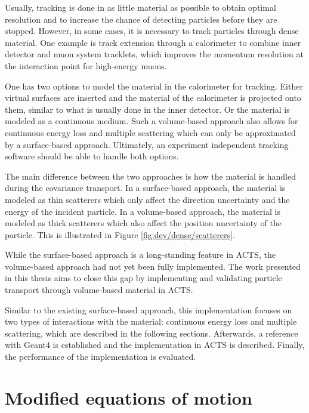 Usually, tracking is done in as little material as possible to obtain optimal resolution and to increase the chance of detecting particles before they are stopped. However, in some cases, it is necessary to track particles through dense material. One example is track extension through a calorimeter to combine inner detector and muon system tracklets, which improves the momentum resolution at the interaction point for high-energy muons.

One has two options to model the material in the calorimeter for tracking. Either virtual surfaces are inserted and the material of the calorimeter is projected onto them, similar to what is usually done in the inner detector. Or the material is modeled as a continuous medium. Such a volume-based approach also allows for continuous energy loss and multiple scattering which can only be approximated by a surface-based approach. Ultimately, an experiment independent tracking software should be able to handle both options.

The main difference between the two approaches is how the material is handled during the covariance transport. In a surface-based approach, the material is modeled as thin scatterers which only affect the direction uncertainty and the energy of the incident particle. In a volume-based approach, the material is modeled as thick scatterers which also affect the position uncertainty of the particle. This is illustrated in Figure \ref{fig:dev/dense/scatterers}.



While the surface-based approach is a long-standing feature in ACTS, the volume-based approach had not yet been fully implemented. The work presented in this thesis aims to close this gap by implementing and validating particle transport through volume-based material in ACTS.

Similar to the existing surface-based approach, this implementation focuses on two types of interactions with the material: continuous energy loss and multiple scattering, which are described in the following sections. Afterwards, a reference with Geant4 \cite{geant4-2003}\cite{geant4-2006}\cite{geant4-2016} is established and the implementation in ACTS is described. Finally, the performance of the implementation is evaluated.

\section{Modified equations of motion}
\label{sec:dev/dense/equations-of-motion}

